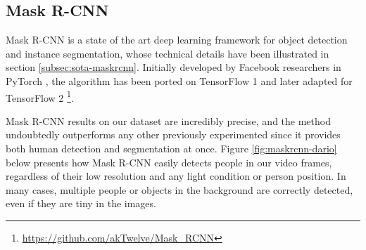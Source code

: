 



\subsection{Mask R-CNN}
\label{subsec:masking-maskrcnn}

Mask R-CNN \cite{he2018mask} is a state of the art deep learning framework for object detection and instance segmentation, whose technical details have been illustrated in section \ref{subsec:sota-maskrcnn}. Initially developed by Facebook researchers in PyTorch \cite{pytorch}, the algorithm has been ported on TensorFlow 1 \cite{MaskRCNN_matterport} and later adapted for TensorFlow 2 \cite{MaskRCNN_akTwelve}\footnote{\url{https://github.com/akTwelve/Mask_RCNN}}.

\medskip

Mask R-CNN results on our dataset are incredibly precise, and the method undoubtedly outperforms any other previously experimented since it provides both human detection and segmentation at once. Figure \ref{fig:maskrcnn-dario} below presents how Mask R-CNN easily detects people in our video frames, regardless of their low resolution and any light condition or person position. In many cases, multiple people or objects in the background are correctly detected, even if they are tiny in the images.

